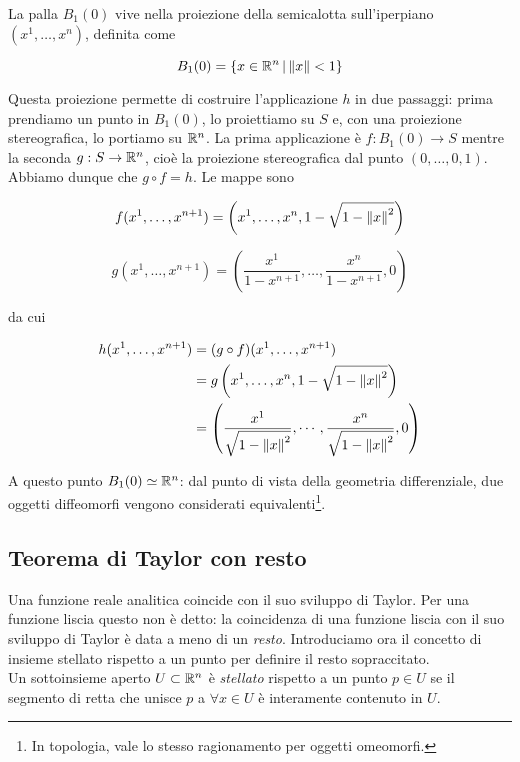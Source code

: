 La palla $ B_{1}(0) $ vive nella proiezione della semicalotta sull'iperpiano $ (x^{1}, \dots, x^{n}) $, definita come

\begin{equation}
	B_{1}(0) = \left\{ x \in \mathbb{R}^{n} \, \middle| \, \norm{x} < 1 \right\}
\end{equation}

Questa proiezione permette di costruire l'applicazione $ h $ in due passaggi: prima prendiamo un punto in $ B_{1}(0) $, lo proiettiamo su $ S $ e, con una proiezione stereografica, lo portiamo su $ \mathbb{R}^{n} $. La prima applicazione è $ f : B_{1}(0) \to S $ mentre la seconda $ g : S \to \mathbb{R}^{n} $, cioè la proiezione stereografica dal punto $ (0,\dots,0,1) $. Abbiamo dunque che $ g \circ f = h $. Le mappe sono

\begin{equation}
	f (x^{1},\dots,x^{n+1}) = \left( x^{1},\dots,x^{n},1-\sqrt{1-\norm{x}^{2}} \right)
\end{equation}

\begin{equation}
	g (x^{1},\dots,x^{n+1}) = \left( \dfrac{x^{1}}{1-x^{n+1}},\dots,\dfrac{x^{n}}{1-x^{n+1}},0 \right)
\end{equation}

da cui

\begin{align}
	\begin{split}
		h (x^{1},\dots,x^{n+1}) &= (g \circ f) (x^{1},\dots,x^{n+1})\\
		&= g \left( x^{1},\dots,x^{n},1-\sqrt{1-\norm{x}^{2}} \right)\\
		&= \left( \dfrac{x^{1}}{\sqrt{1 - \norm{x}^{2}}}, \cdots, \dfrac{x^{n}}{\sqrt{1 - \norm{x}^{2}}}, 0 \right)
	\end{split}
\end{align}

A questo punto $ B_{1} (0) \simeq \mathbb{R}^{n} $: dal punto di vista della geometria differenziale, due oggetti diffeomorfi vengono considerati equivalenti\footnote{%
	In topologia, vale lo stesso ragionamento per oggetti omeomorfi.%
}.

\subsection{Teorema di Taylor con resto}

Una funzione reale analitica coincide con il suo sviluppo di Taylor. Per una funzione liscia questo non è detto: la coincidenza di una funzione liscia con il suo sviluppo di Taylor è data a meno di un \textit{resto}. Introduciamo ora il concetto di insieme stellato rispetto a un punto per definire il resto sopraccitato.\\
Un sottoinsieme aperto $ U \subset \mathbb{R}^{n} $ è \textit{stellato} rispetto a un punto $ p \in U $ se il segmento di retta che unisce $ p $ a $ \forall x \in U $ è interamente contenuto in $ U $.

